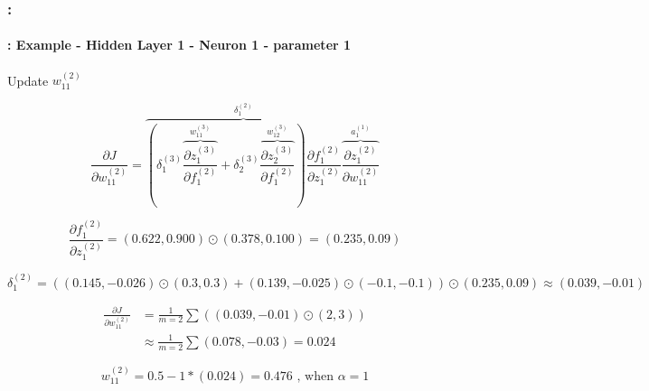 \documentclass[xcolor=table]{beamer}
\begin{document}
\begin{frame}
	\frametitle{\insertshortsubtitle: \insertsection}
	\framesubtitle{\insertsubsection: Example - Hidden Layer 1 - Neuron 1 - parameter 1}
	
	Update $w_{11}^{(2)}$
	
	\footnotesize
	
	\vskip-24pt
	\[
	\frac{\partial J}{\partial w_{11}^{(2)}} = 
	\overbrace{ 
		\left(
		\delta_{1}^{(3)} 
		\overbrace{
			\frac{\partial z_{1}^{(3)}}{\partial f_{1}^{(2)}}
		}^{w_{11}^{(3)}}
		+
		\delta_{2}^{(3)} 
		\overbrace{
			\frac{\partial z_{2}^{(3)}}{\partial f_{1}^{(2)}}
		}^{w_{12}^{(3)}}
		\right)
		\frac{\partial f_{1}^{(2)}}{\partial z_{1}^{(2)}}
	}^{\delta_{1}^{(2)}} 
	\overbrace{
		\frac{\partial z_{1}^{(2)}}{\partial w_{11}^{(2)}}
	}^{a_{1}^{(1)}}
	\]
	
	\vskip-6pt
	\[
	\frac{\partial f_{1}^{(2)}}{\partial z_{1}^{(2)}} = (0.622, 0.900) \odot (0.378, 0.100) = (0.235, 0.09)
	\]
	
	\vskip-6pt
	\[
	\delta_{1}^{(2)} = ((0.145, -0.026) \odot (0.3, 0.3) + (0.139, -0.025) \odot (-0.1, -0.1)) \odot (0.235, 0.09) \approx (0.039, -0.01)
	\]
	
	\vskip-12pt
	\begin{align*}
		\frac{\partial J}{\partial w_{11}^{(2)}} & = \frac{1}{m=2} \sum ((0.039, -0.01) \odot (2, 3))    \\
		& \approx \frac{1}{m=2} \sum (0.078, -0.03) = 0.024
	\end{align*}
	
	\vskip-6pt
	\[
	w_{11}^{(2)} = 0.5 - 1 * (0.024) = 0.476 \text{ , when } \alpha = 1
	\]
	
\end{frame}
\end{document}
